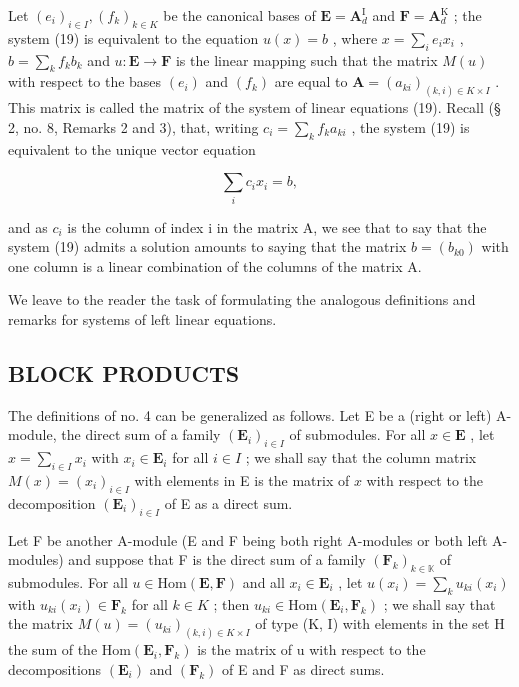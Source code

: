 Let \((e_i)_{i\in I}, (f_k)_{k\in K}\) be the canonical bases of \(\mathbf{E} = \mathbf{A}_d^{\mathrm{I}}\) and \(\mathbf{F} = \mathbf{A}_d^{\mathrm{K}}\) ; the system (19) is equivalent to the equation \(u(x) = b\) , where \(x = \sum_{i} e_i x_i\) , \(b = \sum_{k} f_k b_k\) and \(u: \mathbf{E} \to \mathbf{F}\) is the linear mapping such that the matrix \(M(u)\) with respect to the bases \((e_i)\) and \((f_k)\) are equal to \(\mathbf{A} = (a_{ki})_{(k,i)\in K\times I}\) . This matrix is called the matrix of the system of linear equations (19). Recall (§ 2, no. 8, Remarks 2 and 3), that, writing \(c_i = \sum_{k} f_k a_{ki}\) , the system (19) is equivalent to the unique vector equation

\[
\sum_ {i} c _ {i} x _ {i} = b,\tag{20}
\]

and as \(c_{i}\) is the column of index i in the matrix A, we see that to say that the system (19) admits a solution amounts to saying that the matrix \(b = (b_{k0})\) with one column is a linear combination of the columns of the matrix A.

We leave to the reader the task of formulating the analogous definitions and remarks for systems of left linear equations.

\subsection{BLOCK PRODUCTS}

The definitions of no. 4 can be generalized as follows. Let E be a (right or left) A-module, the direct sum of a family \((\mathbf{E}_i)_{i\in I}\) of submodules. For all \(x\in \mathbf{E}\) , let \(x = \sum_{i\in I}x_i\) with \(x_{i}\in \mathbf{E}_{i}\) for all \(i\in I\) ; we shall say that the column matrix \(M(x) = (x_{i})_{i\in I}\) with elements in E is the matrix of \(x\) with respect to the decomposition \((\mathbf{E}_i)_{i\in I}\) of E as a direct sum.

Let F be another A-module (E and F being both right A-modules or both left A-modules) and suppose that F is the direct sum of a family \((\mathbf{F}_{k})_{k\in\mathbb{K}}\) of submodules. For all \(u\in\mathrm{Hom}(\mathbf{E},\mathbf{F})\) and all \(x_{i}\in\mathbf{E}_{i}\) , let \(u(x_{i})=\sum_{k}u_{ki}(x_{i})\) with \(u_{ki}(x_{i})\in\mathbf{F}_{k}\) for all \(k\in K\) ; then \(u_{ki}\in\mathrm{Hom}(\mathbf{E}_{i},\mathbf{F}_{k})\) ; we shall say that the matrix \(M(u)=(u_{ki})_{(k,i)\in K\times I}\) of type (K, I) with elements in the set H the sum of the \(\mathrm{Hom}(\mathbf{E}_{i},\mathbf{F}_{k})\) is the matrix of u with respect to the decompositions \((\mathbf{E}_{i})\) and \((\mathbf{F}_{k})\) of E and F as direct sums.

